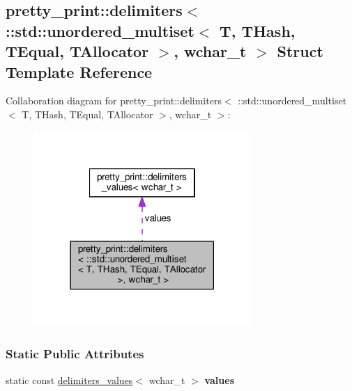 \hypertarget{structpretty__print_1_1delimiters_3_01_1_1std_1_1unordered__multiset_3_01T_00_01THash_00_01TEqua6ff035f2b1f179176ae9326e9c79f116}{}\subsection{pretty\+\_\+print\+:\+:delimiters$<$ \+:\+:std\+:\+:unordered\+\_\+multiset$<$ T, T\+Hash, T\+Equal, T\+Allocator $>$, wchar\+\_\+t $>$ Struct Template Reference}
\label{structpretty__print_1_1delimiters_3_01_1_1std_1_1unordered__multiset_3_01T_00_01THash_00_01TEqua6ff035f2b1f179176ae9326e9c79f116}


Collaboration diagram for pretty\+\_\+print\+:\+:delimiters$<$ \+:\+:std\+:\+:unordered\+\_\+multiset$<$ T, T\+Hash, T\+Equal, T\+Allocator $>$, wchar\+\_\+t $>$\+:
\nopagebreak
\begin{figure}[H]
\begin{center}
\leavevmode
\includegraphics[width=234pt]{structpretty__print_1_1delimiters_3_01_1_1std_1_1unordered__multiset_3_01T_00_01THash_00_01TEqua5634c65328dc1ccf42b55d2b03362519}
\end{center}
\end{figure}
\subsubsection*{Static Public Attributes}
\begin{DoxyCompactItemize}
\item 
static const \hyperlink{structpretty__print_1_1delimiters__values}{delimiters\+\_\+values}$<$ wchar\+\_\+t $>$ {\bfseries values}\hypertarget{structpretty__print_1_1delimiters_3_01_1_1std_1_1unordered__multiset_3_01T_00_01THash_00_01TEqua6ff035f2b1f179176ae9326e9c79f116_a9c2fcb8646486dfba820f04c85f13940}{}\label{structpretty__print_1_1delimiters_3_01_1_1std_1_1unordered__multiset_3_01T_00_01THash_00_01TEqua6ff035f2b1f179176ae9326e9c79f116_a9c2fcb8646486dfba820f04c85f13940}

\end{DoxyCompactItemize}


